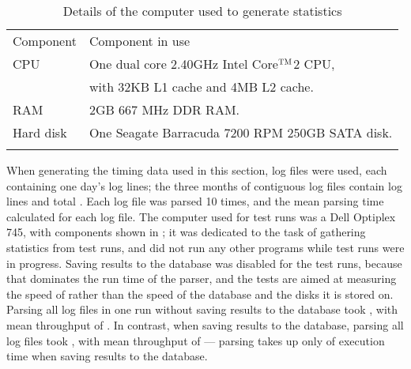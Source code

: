 

\begin{table}[thbp]
    \caption{Details of the computer used to generate statistics}
    \empty{}\label{Details of the computer used to generate statistics}
    \centering{}
    \begin{tabular}[]{ll}
        \tabletopline{}%
        Component  & Component in use                                   \\
        \tablemiddleline{}%
        CPU         & One dual core 2.40GHz Intel\textregistered{}
                        Core$^{\textsc{TM}}$2 CPU,                      \\
                    & with 32KB L1 cache and 4MB L2 cache.              \\
        RAM         & 2GB 667 MHz DDR RAM\@.                            \\
        Hard disk   & One Seagate Barracuda 7200 RPM 250GB SATA disk.   \\
        \tablebottomline{}%
    \end{tabular}
\end{table}

When generating the timing data used in this section, \numberOFlogFILES{}
log files were used, each containing one day's log lines; the three months
of contiguous log files contain \numberOFlogLINEShuman{} log lines and
total .  Each log file was
parsed 10 times, and the mean parsing time calculated for each log file.
The computer used for test runs was a Dell Optiplex 745, with components
shown in ; it
was dedicated to the task of gathering statistics from test runs, and did
not run any other programs while test runs were in progress.  Saving
results to the database was disabled for the test runs, because that
dominates the run time of the parser, and the tests are aimed at measuring
the speed of \parsername{} rather than the speed of the database and the
disks it is stored on.  Parsing all \numberOFlogFILES{} log files in one
run without saving results to the database took
, with mean throughput of
.  In contrast, when saving
results to the database, parsing all \numberOFlogFILES{} log files took
, with mean throughput of
 --- parsing takes up only
 of
execution time when saving results to the database.

